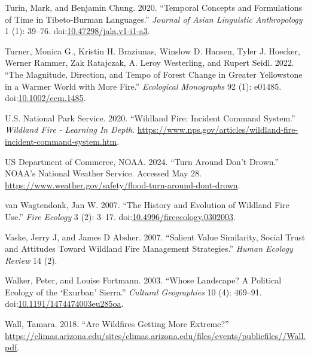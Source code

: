 \documentclass[
]{article}
\newlength{\cslhangindent}
\newenvironment{CSLReferences}[2] %
 {\begin{list}{}{%
  \setlength{\itemindent}{0pt}
  \setlength{\leftmargin}{0pt}
  \setlength{\parsep}{0pt}
  \ifodd #1
   \setlength{\leftmargin}{\cslhangindent}
   \setlength{\itemindent}{-1\cslhangindent}
  \fi
  \setlength{\itemsep}{#2\baselineskip}}}
 {\end{list}}
\begin{document}
\begin{CSLReferences}{1}{0}
Turin, Mark, and Benjamin Chung. 2020. {``Temporal {Concepts} and {Formulations} of {Time} in {Tibeto-Burman Languages}.''} \emph{Journal of Asian Linguistic Anthropology} 1 (1): 39--76. doi:\href{https://doi.org/10.47298/jala.v1-i1-a3}{10.47298/jala.v1-i1-a3}.

Turner, Monica G., Kristin H. Braziunas, Winslow D. Hansen, Tyler J. Hoecker, Werner Rammer, Zak Ratajczak, A. Leroy Westerling, and Rupert Seidl. 2022. {``The Magnitude, Direction, and Tempo of Forest Change in {Greater Yellowstone} in a Warmer World with More Fire.''} \emph{Ecological Monographs} 92 (1): e01485. doi:\href{https://doi.org/10.1002/ecm.1485}{10.1002/ecm.1485}.

U.S. National Park Service. 2020. {``Wildland {Fire}: {Incident Command System}.''} \emph{Wildland Fire - Learning In Depth}. \url{https://www.nps.gov/articles/wildland-fire-incident-command-system.htm}.

US Department of Commerce, NOAA. 2024. {``Turn {Around Don}'t {Drown}{\textregistered}.''} NOAA's National Weather Service. Accessed May 28. \url{https://www.weather.gov/safety/flood-turn-around-dont-drown}.

van Wagtendonk, Jan W. 2007. {``The {History} and {Evolution} of {Wildland Fire Use}.''} \emph{Fire Ecology} 3 (2): 3--17. doi:\href{https://doi.org/10.4996/fireecology.0302003}{10.4996/fireecology.0302003}.

Vaske, Jerry J, and James D Absher. 2007. {``Salient {Value Similarity}, {Social Trust} and {Attitudes} Toward {Wildland Fire Management Strategies}.''} \emph{Human Ecology Review} 14 (2).

Walker, Peter, and Louise Fortmann. 2003. {``Whose Landscape? {A} Political Ecology of the {`Exurban'} {Sierra}.''} \emph{Cultural Geographies} 10 (4): 469--91. doi:\href{https://doi.org/10.1191/1474474003eu285oa}{10.1191/1474474003eu285oa}.

Wall, Tamara. 2018. {``Are {Wildfires Getting More Extreme}?''} \url{https://climas.arizona.edu/sites/climas.arizona.edu/files/events/publicfiles//Wall.pdf}.


\end{CSLReferences}
\end{document}
